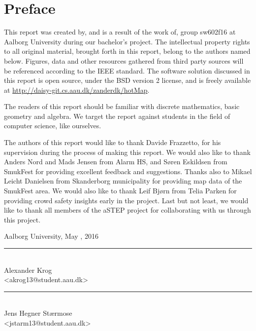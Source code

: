 \chapter*{Preface}\label{ch:preface}
This report was created by, and is a result of the work of, group sw602f16 at Aalborg University during our bachelor's project. The intellectual property rights to all original material, brought forth in this report, belong to the authors named below. Figures, data and other resources gathered from third party sources will be referenced according to the IEEE standard. The software solution discussed in this report is open source, under the BSD version 2 license, and is freely available at \url{http://daisy-git.cs.aau.dk/zanderdk/hotMap}.

The readers of this report should be familiar with discrete mathematics, basic geometry and algebra. We target the report against students in the field of computer science, like ourselves.

The authors of this report would like to thank Davide Frazzetto, for his supervision during the process of making this report. We would also like to thank Anders Nord and Mads Jensen from Alarm HS, and Søren Eskildsen from SmukFest for providing excellent feedback and suggestions. Thanks also to Mikael Leicht Danielsen from Skanderborg municipality for providing map data of the SmukFest area. We would also like to thank Leif Bjørn from Telia Parken for providing crowd safety insights early in the project. Last but not least, we would like to thank all members of the aSTEP project for collaborating with us through this project.

\vspace{\baselineskip}\hfill Aalborg University, May , 2016
\vfill

\noindent
\begin{minipage}[b]{0.45\textwidth}
 \centering
 \rule{\textwidth}{0.5pt}\\
  Alexander Krog\\
 {\footnotesize <akrog13@student.aau.dk>}
\end{minipage}
%
\hfill
%
\begin{minipage}[b]{0.45\textwidth}
 \centering
 \rule{\textwidth}{0.5pt}\\
  Jens Hegner Stærmose\\
 {\footnotesize <jstarm13@student.aau.dk>}
\end{minipage}
%
\vspace{3\baselineskip}

